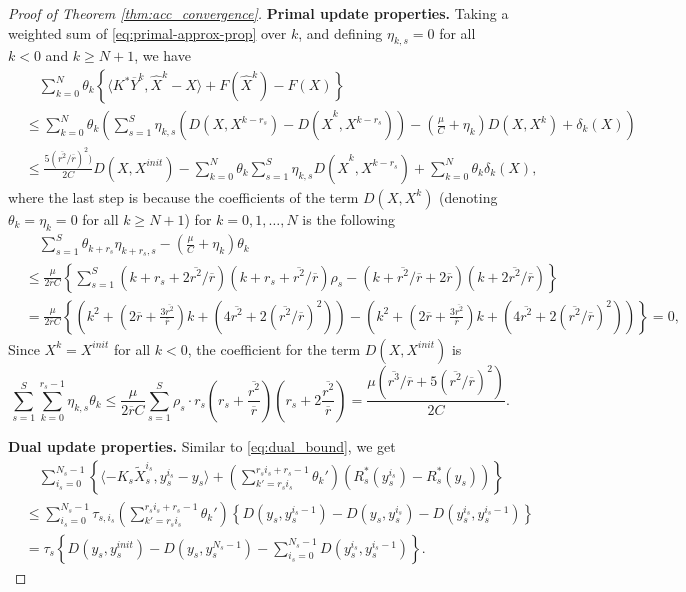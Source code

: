 \documentclass[10pt]{article}
\begin{document}
\begin{proof}[Proof of Theorem \ref{thm:acc_convergence}]
\textbf{Primal update properties.} Taking a weighted sum of \eqref{eq:primal-approx-prop} over $k$, and defining $\eta_{k,s} = 0$ for all $k< 0$ and $k\geq N+1$, we have
\begin{align*}
    &\quad \sum_{k=0}^N\theta_k\left\{\langle K^* \overline{Y}^k,\widehat{X}^k-X\rangle + F(\widehat{X}^k) - F(X) \right\}\\
    &\leq \sum_{k=0}^N\theta_k\left(\sum_{s=1}^S  \eta_{k,s} \left(D(X,X^{k-r_s})-D(\widehat{X}^k,X^{k-r_s})\right)-(\frac{\mu}{C}+\eta_k)D(X,X^k)+\delta_k(X)\right)\\
    &\leq \frac{5(\overline{r^2}/\overline{r})^2)}{2C}D(X,X^{init})-\sum_{k=0}^N\theta_k\sum_{s=1}^S  \eta_{k,s} D(\widehat{X}^k,X^{k-r_s})+\sum_{k=0}^N\theta_k\delta_k(X),
\end{align*}
where the last step is because the coefficients of the term $D(X,X^k)$ (denoting $\theta_k = \eta_{k} = 0$ for all $k\geq N+1$) for $k=0,1,\ldots,N$ is the following
\begin{align*}
    &\quad \sum_{s= 1}^S \theta_{k+r_s}\eta_{k+r_s,s} - (\frac{\mu}{C}+\eta_k)\theta_k\\
    &\leq \frac{\mu}{2\overline{r}C}\left\{\sum_{s= 1}^S (k+r_s+2\overline{r^2}/\overline{r})(k+r_s+\overline{r^2}/\overline{r})\rho_s- (k+\overline{r^2}/\overline{r}+2\overline{r})(k+2\overline{r^2}/\overline{r})\right\}\\
    & = \frac{\mu}{2\overline{r}C}\left\{ \left( k^2 + (2\overline{r} + \frac{3\overline{r^2}}{\overline{r}})k + (4\overline{r^2} + 2(\overline{r^2}/\overline{r})^2) \right)-\left(k^2 + (2\overline{r} + \frac{3\overline{r^2}}{\overline{r}})k +  (4\overline{r^2} + 2(\overline{r^2}/\overline{r})^2)\right)\right\}= 0,
\end{align*}
Since $X^{k} = X^{init}$ for all $k<0$, the coefficient for the term $D(X,X^{init})$ is 
\begin{displaymath}
    \sum_{s=1}^S \sum_{k=0}^{r_s-1} \eta_{k,s}\theta_{k}  \leq  \frac{\mu }{2\overline{r}C}\sum_{s=1}^S \rho_s\cdot r_s(r_s +\frac{\overline{r^2}}{\overline{r}})(r_s +2\frac{\overline{r^2}}{\overline{r}})=\frac{\mu(\overline{r^3}/\overline{r} + 5(\overline{r^2}/\overline{r})^2)}{2C}. 
\end{displaymath}


\textbf{Dual update properties.} Similar to \eqref{eq:dual_bound}, we get 
\begin{align}\label{eq:dual_bound2}
     &\quad \sum_{i_s=0}^{N_s-1}\left\{\langle -K_s\widetilde{X}_{s}^{i_s},y_s^{i_s}-y_s\rangle + (\sum_{k'=r_si_s}^{r_si_s+r_s-1}\theta_k')(R^*_s(y_s^{i_s})  - R^*_s(y_s))\right\}\nonumber\\
     &\leq \sum_{i_s=0}^{N_s-1} \tau_{s,i_s}(\sum_{k'=r_si_s}^{r_si_s+r_s-1}\theta_k')\left\{D(y_s,y_s^{i_s-1}) - D(y_s,y_s^{i_s})-D(y^{i_s}_s,y_s^{i_s-1})\right\}\nonumber\\
     &=  \tau_{s}\left\{D(y_s,y_s^{init}) - D(y_s,y_s^{N_s-1})-\sum_{i_s=0}^{N_s-1} D(y^{i_s}_s,y_s^{i_s-1})\right\}.
\end{align}


\end{proof}
\end{document}
